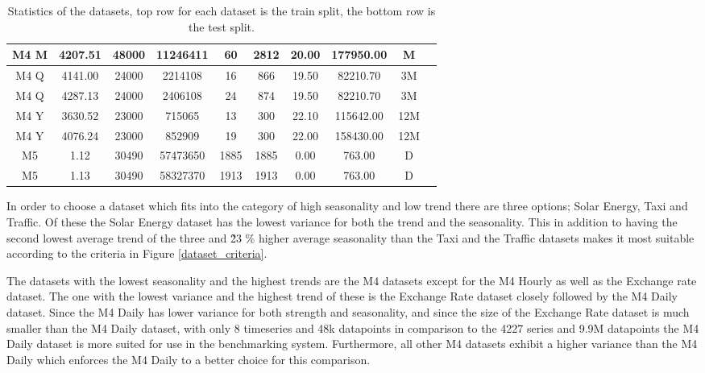 \begin{table}[htb]
\begin{tabular}{c | c c c c c c c c c}
    M4 M              & 4207.51        & 48000            & 11246411        & 60                 & 2812              & 20.00         & 177950.00     & M               \\
    \hline
    M4 Q              & 4141.00        & 24000            & 2214108         & 16                 & 866               & 19.50         & 82210.70      & 3M              \\
    M4 Q              & 4287.13        & 24000            & 2406108         & 24                 & 874               & 19.50         & 82210.70      & 3M              \\
    \hline
    M4 Y              & 3630.52        & 23000            & 715065          & 13                 & 300               & 22.10         & 115642.00     & 12M             \\
    M4 Y              & 4076.24        & 23000            & 852909          & 19                 & 300               & 22.00         & 158430.00     & 12M             \\
    \hline
    M5                & 1.12           & 30490            & 57473650        & 1885               & 1885              & 0.00          & 763.00        & D               \\
    M5                & 1.13           & 30490            & 58327370        & 1913               & 1913              & 0.00          & 763.00        & D               \\
    \hline
  \end{tabular}
  \caption{Statistics of the datasets, top row for each dataset is the train split, the bottom row is the test split.}
  \label{tab:dataset_statistics}
\end{table}
\clearpage

In order to choose a dataset which fits into the category of high seasonality and low trend there are three options; Solar Energy, Taxi and Traffic. Of these the Solar Energy dataset has the lowest variance for both the trend and the seasonality. This in addition to having the second lowest average trend of the three and \~23 \% higher average seasonality than the Taxi and the Traffic datasets makes it most suitable according to the criteria in Figure \ref{dataset_criteria}.

The datasets with the lowest seasonality and the highest trends are the M4 datasets except for the M4 Hourly as well as the Exchange rate dataset. The one with the lowest variance and the highest trend of these is the Exchange Rate dataset closely followed by the M4 Daily dataset. Since the M4 Daily has lower variance for both strength and seasonality, and since the size of the Exchange Rate dataset is much smaller than the M4 Daily dataset, with only 8 timeseries and 48k datapoints in comparison to the 4227 series and 9.9M datapoints the M4 Daily dataset is more suited for use in the benchmarking system. Furthermore, all other M4 datasets exhibit a higher variance than the M4 Daily which enforces the M4 Daily to a better choice for this comparison.

